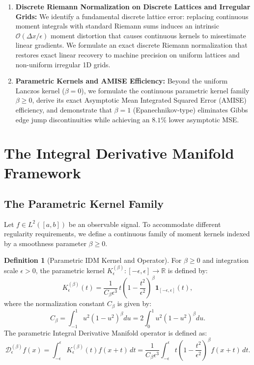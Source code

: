 \documentclass[11pt,a4paper]{article}
\theoremstyle{definition}
\newtheorem{definition}{Definition}
\begin{document}
\begin{enumerate}
    \item \textbf{Discrete Riemann Normalization on Discrete Lattices and Irregular Grids:}
    We identify a fundamental discrete lattice error: replacing continuous moment integrals with standard Riemann sums induces an intrinsic $\mathcal{O}(\Delta x / \epsilon)$ moment distortion that causes continuous kernels to misestimate linear gradients. We formulate an exact discrete Riemann normalization that restores exact linear recovery to machine precision on uniform lattices and non-uniform irregular 1D grids.
    \item \textbf{Parametric Kernels and AMISE Efficiency:}
    Beyond the uniform Lanczos kernel ($\beta = 0$), we formulate the continuous parametric kernel family $\beta \ge 0$, derive its exact Asymptotic Mean Integrated Squared Error (AMISE) efficiency, and demonstrate that $\beta = 1$ (Epanechnikov-type) eliminates Gibbs edge jump discontinuities while achieving an $8.1\%$ lower asymptotic MSE.
\end{enumerate}


\section{The Integral Derivative Manifold Framework}
\label{sec:formulation}

\subsection{The Parametric Kernel Family}
Let $f \in L^2([a, b])$ be an observable signal. To accommodate different regularity requirements, we define a continuous family of moment kernels indexed by a smoothness parameter $\beta \ge 0$.

\begin{definition}[Parametric IDM Kernel and Operator]
For $\beta \ge 0$ and integration scale $\epsilon > 0$, the parametric kernel $K_\epsilon^{(\beta)}: [-\epsilon, \epsilon] \to \mathbb{R}$ is defined by:
\begin{equation}
K_\epsilon^{(\beta)}(t) = \frac{1}{C_\beta \epsilon^3} \, t \left( 1 - \frac{t^2}{\epsilon^2} \right)^\beta \mathbf{1}_{[-\epsilon, \epsilon]}(t),
\label{eq:parametric_kernel}
\end{equation}
where the normalization constant $C_\beta$ is given by:
\begin{equation}
C_\beta = \int_{-1}^{1} u^2 (1 - u^2)^\beta du = 2 \int_0^1 u^2 (1 - u^2)^\beta du.
\end{equation}
The parametric Integral Derivative Manifold operator is defined as:
\begin{equation}
\mathcal{D}_\epsilon^{(\beta)} f(x) = \int_{-\epsilon}^{\epsilon} K_\epsilon^{(\beta)}(t) f(x + t) \, dt = \frac{1}{C_\beta \epsilon^3} \int_{-\epsilon}^{\epsilon} t \left( 1 - \frac{t^2}{\epsilon^2} \right)^\beta f(x + t) \, dt.
\label{eq:operator_def}
\end{equation}
\end{definition}
\end{document}

